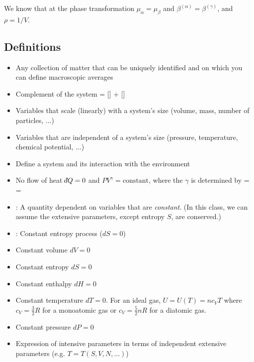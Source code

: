 \documentclass[12pt]{article}
\def\dbar{{\mathchar'26\mkern-12mu d}}
\begin{document}
 We know that at the phase transformation $\mu_\alpha = \mu_\beta$ and $\beta^{(\alpha)} = \beta^{(\gamma)}$, and $\rho = 1/V$.

\subsection{Definitions}
\begin{itemize}
\item {} Any collection of matter that can be uniquely identified and on which you can define macroscopic averages
\item {}  Complement of the system
\eqs
\text{[Universe]} = [] + []
\eqe

\item {} Variables that scale (linearly) with a system's size (volume, mass, number of particles, ...)
\item {} Variables that are  independent of a system's size (pressure, temperature, chemical potential, ...)
\item {} Define a system and its interaction with the environment
\item {} No flow of heat $\dbar Q = 0$ and $PV^{\gamma} = \text{constant}$, where the $\gamma$ is determined by
\eqs
\gamma =  = 
\eqe
\item {}: A quantity dependent on variables that are \emph{constant}.  (In this class, we can assume the extensive parameters, except entropy $S$, are conserved.)
\item {}: Constant entropy process ($dS=0$)
\item {} Constant volume $dV = 0$
\item {} Constant entropy $dS = 0$
\item {} Constant enthalpy $dH = 0$
\item {} Constant temperature $dT=0$.  For an ideal gas, $U = U(T) = n c_V T$ where $c_V = \frac{3}{2} R$ for a monoatomic gas or $c_V = \frac{5}{2} n R$ for a diatomic gas.
\item {} Constant pressure $dP = 0$
\item {} Expression of intensive parameters in terms of independent extensive parameters (e.g. $T= T(S,V,N,...)$)

\end{itemize}
\end{document}
